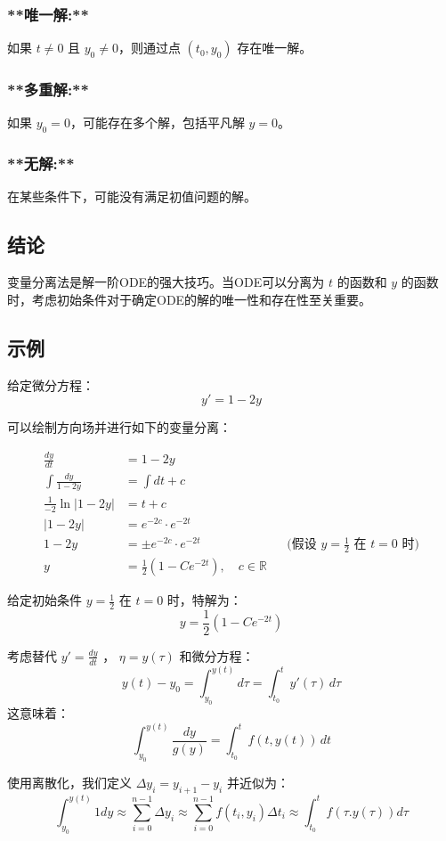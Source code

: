 \documentclass{ctexart}
\begin{document}
\subsubsection*{**唯一解:** }
如果 \( t \neq 0 \) 且 \( y_0 \neq 0 \)，则通过点 \( (t_0, y_0) \) 存在唯一解。

\subsubsection*{**多重解:** }
如果 \( y_0 = 0 \)，可能存在多个解，包括平凡解 \( y = 0 \)。

\subsubsection*{**无解:** }
在某些条件下，可能没有满足初值问题的解。

\subsection*{结论}
变量分离法是解一阶ODE的强大技巧。当ODE可以分离为 \( t \) 的函数和 \( y \) 的函数时，考虑初始条件对于确定ODE的解的唯一性和存在性至关重要。
\subsection*{示例}
给定微分方程：
\[ y' = 1 - 2y \]

可以绘制方向场并进行如下的变量分离：

\begin{align*}
\frac{dy}{dt} &= 1 - 2y \\
\int \frac{dy}{1 - 2y} &= \int dt + c \\
\frac{1}{-2} \ln |1 - 2y| &= t + c \\
|1 - 2y| &= e^{-2c} \cdot e^{-2t} \\
1 - 2y &= \pm e^{-2c} \cdot e^{-2t} && \text{(假设 $y = \frac{1}{2}$ 在 $t=0$ 时)} \\
y &= \frac{1}{2}(1 - C e^{-2t}), \quad c \in \mathbb{R}
\end{align*}

给定初始条件 \( y = \frac{1}{2} \) 在 \( t = 0 \) 时，特解为：
\[ y = \frac{1}{2}(1 - C e^{-2t}) \]

考虑替代 \( y' = \frac{dy}{dt} \) ， \( \eta = y(\tau) \) 和微分方程：
\[ y(t) - y_0 =\int_{y_0}^{y(t)}d\tau = \int_{t_0}^{t} y'(\tau) \, d\tau \]
这意味着：
\[ \int_{y_0}^{y(t)} \frac{dy}{g(y)} = \int_{t_0}^{t} f(t,y(t)) \, dt \]

使用离散化，我们定义 \( \Delta y_i = y_{i+1} - y_i \) 并近似为：
\[ \int_{y_0}^{y(t)} 1dy \approx \sum_{i=0}^{n-1} \Delta y_i \approx \sum_{i=0}^{n-1} f(t_i,y_i) \Delta t_i \approx 
\int_{t_0}^{t} f (\tau. y(\tau))d\tau\]
\end{document}
